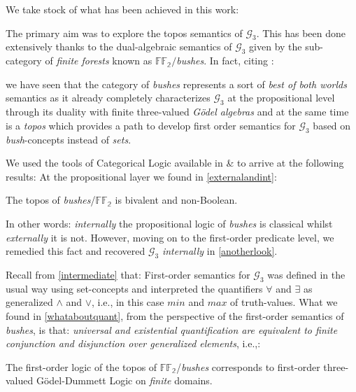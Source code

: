 

We take stock of what has been achieved in this work:
\newline

The primary aim was to explore the topos semantics of $\mathcal{G}_3$. This has been done extensively thanks to the dual-algebraic semantics of $\mathcal{G}_3$ given by the sub-category of \emph{finite forests} known as $\mathbb{FF_2}/$\emph{bushes}.\newline
In fact, citing \cite{towards}:
\begin{remark}
	we have seen that the category of \emph{bushes} represents a sort of \emph{best of both worlds} semantics as it already completely characterizes $\mathcal{G}_3$ at the propositional level through its duality with finite three-valued \emph{Gödel algebras} and at the same time is a \emph{topos} which provides a path to develop first order semantics for $\mathcal{G}_3$ based on \emph{bush}-concepts instead of \emph{sets}.
\end{remark}
 
 We used the tools of Categorical Logic available in \cite{goldblatt} \& \cite{lambekscott} to arrive at the following results:
 \newline
 At the propositional layer we found in \ref{externalandint}:
 \begin{prop*}
 		The topos of \emph{bushes}/$\mathbb{FF_2}$ is bivalent and non-Boolean.
 	\end{prop*}
In other words: \emph{internally} the propositional logic of \emph{bushes} is classical whilst \emph{externally} it is not.\newline
However, moving on to the first-order predicate level, we remedied this fact and recovered $\mathcal{G}_3$ \emph{internally} in \ref{anotherlook}.\newline
 
 Recall from \ref{intermediate} that:
 	First-order semantics for $\mathcal{G}_3$ was defined in the usual way using set-concepts and interpreted the quantifiers $\forall$ and $\exists$ as generalized $\land$ and $\lor$, i.e., in this case $min$ and $max$ of truth-values.	\newline
What we found in \ref{whataboutquant}, from the perspective of the first-order semantics of \emph{bushes}, is that:
\emph{universal and existential quantification are equivalent to finite conjunction and disjunction over generalized elements}, i.e.,:

\begin{prop*}
		The  first-order logic of the topos of $\mathbb{FF_2}$/\emph{bushes} corresponds to first-order three-valued Gödel-Dummett Logic on \emph{finite} domains.
\end{prop*}


